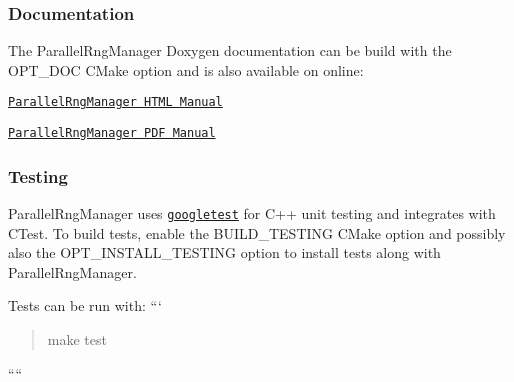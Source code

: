 \subsubsection*{Documentation}

The Parallel\-Rng\-Manager Doxygen documentation can be build with the {\ttfamily O\-P\-T\-\_\-\-D\-O\-C} C\-Make option and is also available on online\-:
\begin{DoxyItemize}
\item \href{https://markjolah.github.io/ParallelRngManager/index.html}{\tt Parallel\-Rng\-Manager H\-T\-M\-L Manual}
\item \href{https://markjolah.github.io/ParallelRngManager/pdf/ParallelRngManager-0.3-reference.pdf}{\tt Parallel\-Rng\-Manager P\-D\-F Manual}
\end{DoxyItemize}

\subsubsection*{Testing}

Parallel\-Rng\-Manager uses \href{https://github.com/google/googletest}{\tt googletest} for C++ unit testing and integrates with C\-Test. To build tests, enable the {\ttfamily B\-U\-I\-L\-D\-\_\-\-T\-E\-S\-T\-I\-N\-G} C\-Make option and possibly also the {\ttfamily O\-P\-T\-\_\-\-I\-N\-S\-T\-A\-L\-L\-\_\-\-T\-E\-S\-T\-I\-N\-G} option to install tests along with Parallel\-Rng\-Manager.

Tests can be run with\-: ``` \begin{quotation}
make test

\end{quotation}
```` 